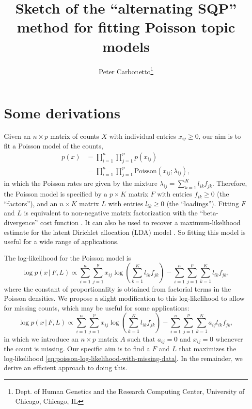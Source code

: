 \documentclass[final]{siamart171218}
\title{Sketch of the ``alternating SQP'' method for fitting Poisson
  topic models}
\author{Peter Carbonetto\thanks{Dept. of Human Genetics and the Research Computing Center, University of Chicago, Chicago, IL}}
\begin{document}
\maketitle

\section{Some derivations}

Given an $n \times p$ matrix of counts $X$ with individual entries
$x_{ij} \geq 0$, our aim is to fit a Poisson model of the counts,
\begin{align}
p(x) &= \prod_{i=1}^n \prod_{j=1}^p p(x_{ij}) \nonumber \\
     &= \prod_{i=1}^n \prod_{j=1}^p \mathrm{Poisson}(x_{ij}; \lambda_{ij}),
\label{eq:poisson-likelihood}
\end{align}
in which the Poisson rates are given by the mixture $\lambda_{ij} =
\sum_{k=1}^K l_{ik} f_{jk}$. Therefore, the Poisson model is specified
by a $p \times K$ matrix $F$ with entries $f_{ik} \geq 0$ (the
``factors''), and an $n \times K$ matrix $L$ with entries $l_{ik} \geq
0$ (the ``loadings''). Fitting $F$ and $L$ is equivalent to
non-negative matrix factorization with the ``beta-divergence'' cost
function \cite{lee-2001}. It can also be used to recover a
maximum-likelihood estimate for the latent Dirichlet allocation (LDA)
model \cite{blei-2003}. So fitting this model is useful for a wide
range of applications.

The log-likelihood for the Poisson model is
\begin{equation}
\log p(x \,|\, F, L) \propto
  \sum_{i=1}^n \sum_{j=1}^p x_{ij} \log
  ({\textstyle \sum_{k=1}^K l_{ik} f_{jk}})
    - \sum_{i=1}^n \sum_{j=1}^p \sum_{k=1}^K l_{ik} f_{jk},
\label{eq:poisson-log-likelihood}
\end{equation}
where the constant of proportionality is obtained from factorial terms
in the Poisson densities. We propose a slight modification to this
log-likelihood to allow for missing counts, which may be useful for
some applications:
\begin{equation}
\log p(x \,|\, F, L) \propto
  \sum_{i=1}^n \sum_{j=1}^p x_{ij} \log
  ({\textstyle \sum_{k=1}^K l_{ik} f_{jk}})
    - \sum_{i=1}^n \sum_{j=1}^p \sum_{k=1}^K a_{ij} l_{ik} f_{jk},
\label{eq:poisson-log-likelihood-with-missing-data}
\end{equation}
in which we introduce an $n \times p$ matrix $A$ such that $a_{ij} =
0$ and $x_{ij} = 0$ whenever the count is missing. Our specific aim is
to find a $F$ and $L$ that maximizes the log-likelihood
\eqref{eq:poisson-log-likelihood-with-missing-data}. In the remainder,
we derive an efficient approach to doing this.



\end{document}
